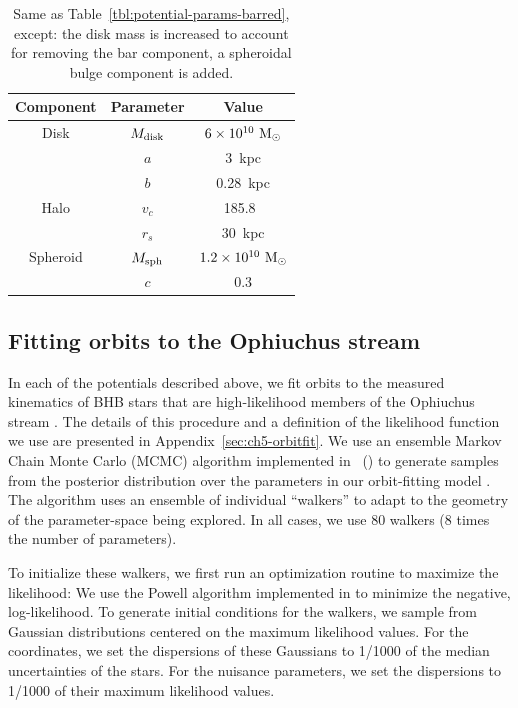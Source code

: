 \begin{table}[ht]
\begin{center}
	\begin{tabular}{ c | c | c }
	         \toprule
	         Component & Parameter & Value \\\toprule
		Disk & $M_{\rm disk}$ & $6 \times 10^{10}~\mathrm{M}_\odot$ \\
		& $a$ & 3~{\rm kpc}\\
		& $b$ & 0.28~{\rm kpc} \\\midrule
	         Halo & $v_c$ & 185.8~\kms\\
		& $r_s$ & 30~kpc \\\midrule
		Spheroid & $M_{\rm sph}$ & $1.2 \times 10^{10}~\mathrm{M}_\odot$ \\
		& $c$ & 0.3 \\
		\bottomrule
		\end{tabular}
	\caption{Same as Table~\ref{tbl:potential-params-barred}, except: the disk mass is increased to account for removing the bar component, a spheroidal bulge component is added. \label{tbl:potential-params-static}}
\end{center}
\end{table}

\subsection{Fitting orbits to the Ophiuchus stream}\label{sec:ch5-orbitfit-nonapdx}

In each of the potentials described above, we fit orbits to the measured
kinematics of BHB stars that are high-likelihood members of the Ophiuchus stream
\citep{sesar15a, sesar16}. The details of this procedure and a definition of the
likelihood function we use are presented in Appendix~\ref{sec:ch5-orbitfit}. We use
an ensemble Markov Chain Monte Carlo (MCMC) algorithm \citep{goodman10}
implemented in \python\ () to generate samples from the posterior
distribution over the parameters in our orbit-fitting model
\citep{foremanmackey13}. The algorithm uses an ensemble of individual
``walkers'' to adapt to the geometry of the parameter-space being explored. In
all cases, we use 80 walkers (8 times the number of parameters).

To initialize these walkers, we first run an optimization routine to maximize
the likelihood: We use the Powell algorithm implemented in 
\citep{powell64, scipy} to minimize the negative, log-likelihood. To generate
initial conditions for the walkers, we sample from Gaussian distributions
centered on the maximum likelihood values. For the coordinates, we set the
dispersions of these Gaussians to 1/1000 of the median uncertainties of the
stars. For the nuisance parameters, we set the dispersions to 1/1000 of their
maximum likelihood values.

